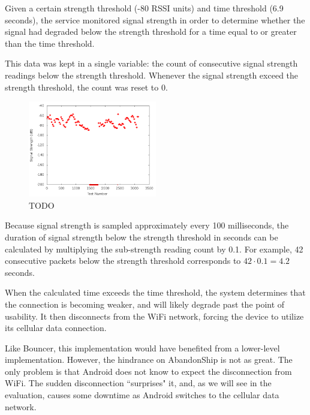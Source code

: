 Given a certain strength threshold (-80 RSSI units) and time threshold (6.9 seconds), the service monitored signal strength in order to determine whether the signal had degraded below the strength threshold for a time equal to or greater than the time threshold.

This data was kept in a single variable: the count of consecutive signal strength readings below the strength threshold. Whenever the signal strength exceed the strength threshold, the count was reset to 0.

\begin{figure}
	\includegraphics[width=0.5\textwidth]{sigStrength}
	\caption{TODO}
\end{figure}

Because signal strength is sampled approximately every 100 milliseconds, the duration of signal strength below the strength threshold in seconds can be calculated by multiplying the sub-strength reading count by 0.1. For example, 42 consecutive packets below the strength threshold corresponds to $ 42 \cdot 0.1 = 4.2 $ seconds.

When the calculated time exceeds the time threshold, the system determines that the connection is becoming weaker, and will likely degrade past the point of usability. It then disconnects from the WiFi network, forcing the device to utilize its cellular data connection.

Like Bouncer, this implementation would have benefited from a lower-level implementation. However, the hindrance on AbandonShip is not as great. The only problem is that Android does not know to expect the disconnection from WiFi. The sudden disconnection ``surprises" it, and, as we will see in the evaluation, causes some downtime as Android switches to the cellular data network.
